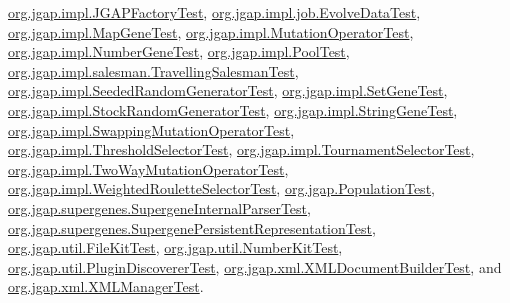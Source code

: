 \hyperlink{classorg_1_1jgap_1_1impl_1_1_j_g_a_p_factory_test}{org.\-jgap.\-impl.\-J\-G\-A\-P\-Factory\-Test}, \hyperlink{classorg_1_1jgap_1_1impl_1_1job_1_1_evolve_data_test}{org.\-jgap.\-impl.\-job.\-Evolve\-Data\-Test}, \hyperlink{classorg_1_1jgap_1_1impl_1_1_map_gene_test}{org.\-jgap.\-impl.\-Map\-Gene\-Test}, \hyperlink{classorg_1_1jgap_1_1impl_1_1_mutation_operator_test}{org.\-jgap.\-impl.\-Mutation\-Operator\-Test}, \hyperlink{classorg_1_1jgap_1_1impl_1_1_number_gene_test}{org.\-jgap.\-impl.\-Number\-Gene\-Test}, \hyperlink{classorg_1_1jgap_1_1impl_1_1_pool_test}{org.\-jgap.\-impl.\-Pool\-Test}, \hyperlink{classorg_1_1jgap_1_1impl_1_1salesman_1_1_travelling_salesman_test}{org.\-jgap.\-impl.\-salesman.\-Travelling\-Salesman\-Test}, \hyperlink{classorg_1_1jgap_1_1impl_1_1_seeded_random_generator_test}{org.\-jgap.\-impl.\-Seeded\-Random\-Generator\-Test}, \hyperlink{classorg_1_1jgap_1_1impl_1_1_set_gene_test}{org.\-jgap.\-impl.\-Set\-Gene\-Test}, \hyperlink{classorg_1_1jgap_1_1impl_1_1_stock_random_generator_test}{org.\-jgap.\-impl.\-Stock\-Random\-Generator\-Test}, \hyperlink{classorg_1_1jgap_1_1impl_1_1_string_gene_test}{org.\-jgap.\-impl.\-String\-Gene\-Test}, \hyperlink{classorg_1_1jgap_1_1impl_1_1_swapping_mutation_operator_test}{org.\-jgap.\-impl.\-Swapping\-Mutation\-Operator\-Test}, \hyperlink{classorg_1_1jgap_1_1impl_1_1_threshold_selector_test}{org.\-jgap.\-impl.\-Threshold\-Selector\-Test}, \hyperlink{classorg_1_1jgap_1_1impl_1_1_tournament_selector_test}{org.\-jgap.\-impl.\-Tournament\-Selector\-Test}, \hyperlink{classorg_1_1jgap_1_1impl_1_1_two_way_mutation_operator_test}{org.\-jgap.\-impl.\-Two\-Way\-Mutation\-Operator\-Test}, \hyperlink{classorg_1_1jgap_1_1impl_1_1_weighted_roulette_selector_test}{org.\-jgap.\-impl.\-Weighted\-Roulette\-Selector\-Test}, \hyperlink{classorg_1_1jgap_1_1_population_test}{org.\-jgap.\-Population\-Test}, \hyperlink{classorg_1_1jgap_1_1supergenes_1_1_supergene_internal_parser_test}{org.\-jgap.\-supergenes.\-Supergene\-Internal\-Parser\-Test}, \hyperlink{classorg_1_1jgap_1_1supergenes_1_1_supergene_persistent_representation_test}{org.\-jgap.\-supergenes.\-Supergene\-Persistent\-Representation\-Test}, \hyperlink{classorg_1_1jgap_1_1util_1_1_file_kit_test}{org.\-jgap.\-util.\-File\-Kit\-Test}, \hyperlink{classorg_1_1jgap_1_1util_1_1_number_kit_test}{org.\-jgap.\-util.\-Number\-Kit\-Test}, \hyperlink{classorg_1_1jgap_1_1util_1_1_plugin_discoverer_test}{org.\-jgap.\-util.\-Plugin\-Discoverer\-Test}, \hyperlink{classorg_1_1jgap_1_1xml_1_1_x_m_l_document_builder_test}{org.\-jgap.\-xml.\-X\-M\-L\-Document\-Builder\-Test}, and \hyperlink{classorg_1_1jgap_1_1xml_1_1_x_m_l_manager_test}{org.\-jgap.\-xml.\-X\-M\-L\-Manager\-Test}.



